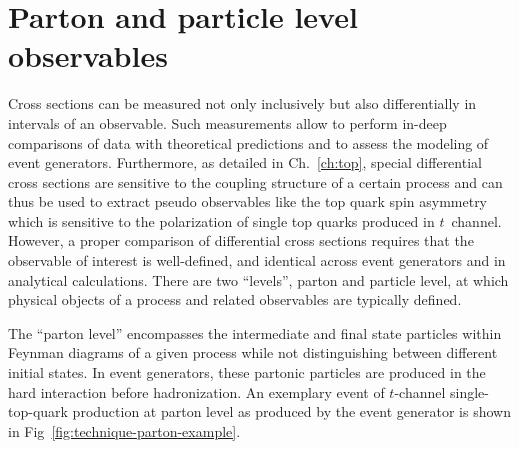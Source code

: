 \section{Parton and particle level observables}

Cross sections can be measured not only inclusively but also differentially in intervals of an observable. Such measurements allow to perform in-deep comparisons of data with theoretical predictions and to assess the modeling of event generators. Furthermore, as detailed in Ch.~\ref{ch:top}, special differential cross sections are sensitive to the coupling structure of a certain process and can thus be used to extract pseudo observables like the top quark spin asymmetry which is sensitive to the polarization of single top quarks produced in $t$~channel. However, a proper comparison of differential cross sections requires that the observable of interest is well-defined, and identical across event generators and in analytical calculations. There are two ``levels'', parton and particle level, at which physical objects of a process and related observables are typically defined. 

The ``parton level'' encompasses the intermediate and final state particles within Feynman diagrams of a given process while not distinguishing between different initial states. In event generators, these partonic particles are produced in the hard interaction before hadronization. An exemplary event of $t$-channel single-top-quark production at parton level as produced by the \POWHEG event generator is shown in Fig~\ref{fig:technique-parton-example}. 



